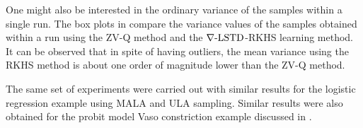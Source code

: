 One might also be interested in the ordinary variance of the samples within a single run. The box plots in  compare the variance values of the samples obtained within a run using the ZV-Q method and the $\nabla\text{-LSTD}$-RKHS learning method. It can be observed that in spite of having outliers, the mean variance using the RKHS method is about one order of magnitude lower than the ZV-Q method.

The same set of experiments were carried out with similar results for the logistic regression example using MALA and ULA sampling. Similar results were also obtained for the probit model Vaso constriction example discussed in \cite{papmirgir14}.

\begin{figure}[htbp]
	\centering
	\mbox{
	}
	\mbox{
}
\end{figure}
